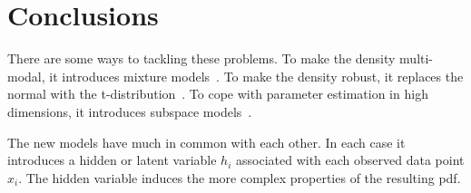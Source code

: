 \documentclass[10pt,twocolumn,letterpaper]{article}
\begin{document}
\section{Conclusions}
\par There are some ways to tackling these problems. To make the density multi-modal, it introduces mixture models~\cite{Figueiredo2000Unsupervised}. To make the density robust, it replaces the normal with the t-distribution~\cite{Coornish1954The}. To cope with parameter estimation in high dimensions, it introduces subspace models~\cite{Verhaegen1995Identifying}.
\par The new models have much in common with each other. In each case it introduces a hidden or latent variable $h_i$ associated with each observed data point $x_i$. The hidden variable induces the more complex properties of the resulting pdf.


{\small


}
\end{document}
